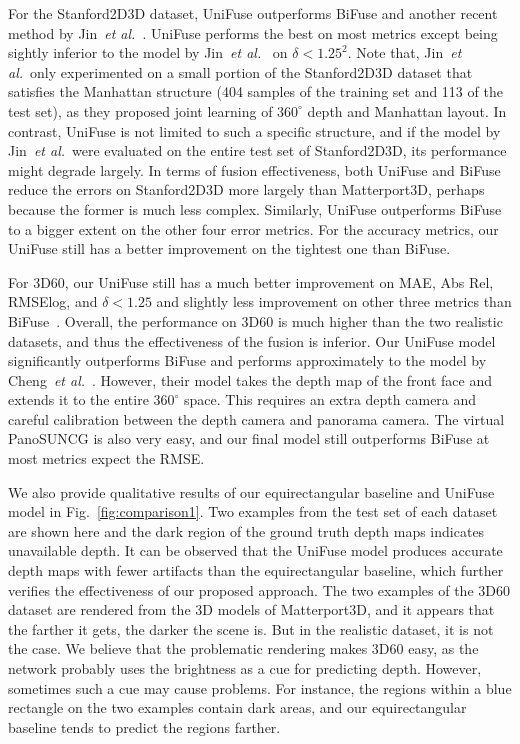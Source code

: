\documentclass[letterpaper, 10 pt, conference]{ieeeconf}
\def\etal{\emph{et al.}}
\begin{document}
For the Stanford2D3D dataset, UniFuse outperforms BiFuse and another recent method by Jin~\etal~\cite{jin2020geometric}. UniFuse performs the best on most metrics except being sightly inferior to the model by Jin~\etal~\cite{jin2020geometric} on $\delta<1.25^2$. Note that, Jin~\etal~only experimented on a small portion of the Stanford2D3D dataset that satisfies the Manhattan structure (404 samples of the training set and 113 of the test set), as they proposed joint learning of $360^{\circ}$ depth and Manhattan layout. In contrast, UniFuse is not limited to such a specific structure, and if the model by Jin~\etal \ were evaluated on the entire test set of Stanford2D3D, its performance might degrade largely. In terms of fusion effectiveness, both UniFuse and BiFuse~\cite{wang2020bifuse} reduce the errors on Stanford2D3D more largely than Matterport3D, perhaps because the former is much less complex. Similarly, UniFuse outperforms BiFuse to a bigger extent on the other four error metrics. For the accuracy metrics, our UniFuse still has a better improvement on the tightest one than BiFuse. 

For 3D60, our UniFuse still has a much better improvement on MAE, Abs Rel, RMSElog, and $\delta<1.25$ and slightly less improvement on other three metrics than BiFuse~\cite{wang2020bifuse}. Overall, the performance on 3D60 is much higher than the two realistic datasets, and thus the effectiveness of the fusion is inferior. Our UniFuse model significantly outperforms BiFuse and performs approximately to the model by Cheng~\etal~\cite{cheng2020ode}. However, their model takes the depth map of the front face and extends it to the entire $360^{\circ}$ space. This requires an extra depth camera and careful calibration between the depth camera and panorama camera. 
The virtual PanoSUNCG is also very easy, and our final model still outperforms BiFuse at most metrics expect the RMSE.


We also provide qualitative results of our equirectangular baseline and UniFuse model in Fig.~\ref{fig:comparison1}. Two examples from the test set of each dataset are shown here and the dark region of the ground truth depth maps indicates unavailable depth. It can be observed that the UniFuse model produces accurate depth maps with fewer artifacts than the equirectangular baseline, which further verifies the effectiveness of our proposed approach. 
The two examples of the 3D60 dataset are rendered from the 3D models of Matterport3D, and it appears that the farther it gets, the darker the scene is. But in the realistic dataset, it is not the case. We believe that the problematic rendering makes 3D60 easy, as the network probably uses the brightness as a cue for predicting depth. However, sometimes such a cue may cause problems. For instance, the regions within a blue rectangle on the two examples contain dark areas, and our equirectangular baseline tends to predict the regions farther. 
\end{document}

